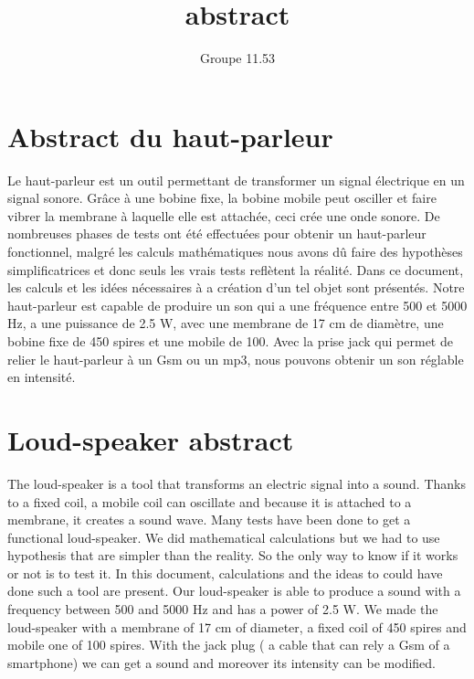 \documentclass{report}
\title{abstract}
\author{Groupe 11.53}
\begin{document}
 
\maketitle

\section{Abstract du haut-parleur}

Le haut-parleur est un outil permettant de transformer un signal électrique en un signal sonore.  Grâce à une bobine fixe, la bobine mobile peut osciller et faire vibrer la membrane à laquelle elle est attachée, ceci crée une onde sonore.
De nombreuses phases de tests ont été effectuées pour obtenir un haut-parleur fonctionnel, malgré les calculs mathématiques nous avons dû faire des hypothèses simplificatrices et donc seuls les vrais tests reflètent la réalité.
Dans ce document, les calculs et les idées nécessaires à a création d’un tel objet sont présentés.  
Notre haut-parleur est capable de produire un son qui a une fréquence entre 500 et 5000 Hz, a une puissance de 2.5 W, avec une membrane de 17 cm de diamètre, une bobine fixe de 450 spires et une mobile de 100.  Avec la prise jack qui permet de relier le haut-parleur à un Gsm ou un mp3, nous pouvons obtenir un son réglable en intensité.

\section{Loud-speaker abstract}

The loud-speaker is a tool that transforms an electric signal into a sound.  Thanks to a fixed coil, a mobile coil can oscillate and because it is attached to a membrane, it creates a sound wave.  
Many tests have been done to get a functional loud-speaker.  We did mathematical calculations but we had to use hypothesis that are simpler than the reality.  So the only way to know if it works or not is to test it.
In this document, calculations and the ideas to could have done such a tool are present.  
Our loud-speaker is able to produce a sound with a frequency between 500 and 5000 Hz and has a power of 2.5 W.  We made the loud-speaker with a membrane of 17 cm of diameter, a fixed coil of 450 spires and mobile one of 100 spires.  With the jack plug ( a cable that can rely a Gsm of a smartphone) we can get a sound and moreover its intensity can be modified.
\end{document}

